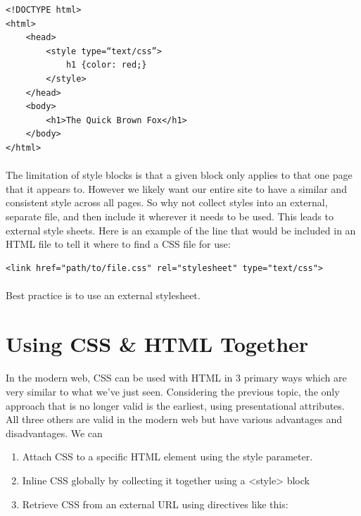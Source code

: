\begin{lstlisting}
<!DOCTYPE html>
<html>
	<head>
		<style type=“text/css”>
			h1 {color: red;}
		</style>
	</head>
	<body>
		<h1>The Quick Brown Fox</h1>
	</body>
</html>
\end{lstlisting}

\paragraph{} The limitation of style blocks is that a given block only applies to that one page that it appears to. However we likely want our entire site to have a similar and consistent style across all pages. So why not collect styles into an external, separate file, and then include it wherever it needs to be used. This leads to external style sheets. Here is an example of the line that would be included in an HTML file to tell it where to find a CSS file for use:

\begin{lstlisting}  
<link href="path/to/file.css" rel="stylesheet" type="text/css">
\end{lstlisting}

\paragraph{} Best practice is to use an external stylesheet.


\section{Using CSS \& HTML Together}
\paragraph{} In the modern web, CSS can be used with HTML in 3 primary ways which are very similar to what we've just seen. Considering the previous topic, the only approach that is no longer valid is the earliest, using presentational attributes. All three others are valid in the modern web but have various advantages and disadvantages. We can

\begin{enumerate}
	\item Attach CSS to a specific HTML element using the style parameter.
	\item Inline CSS globally by collecting it together using a <style> block
    \item Retrieve CSS from an external URL using directives like this:
\end{enumerate}

